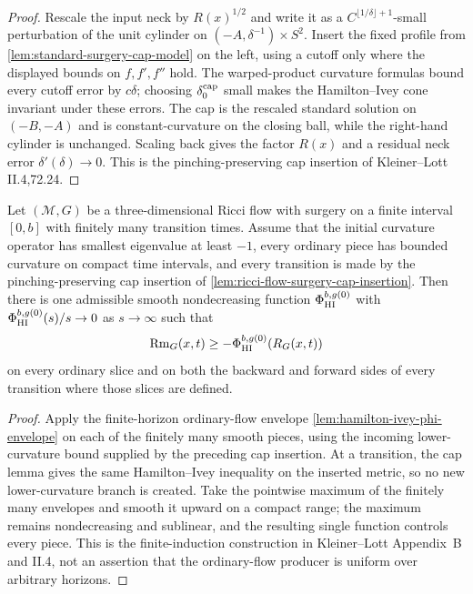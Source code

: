 \begin{proof}
Rescale the input neck by $R(x)^{1/2}$ and write it as a
$C^{\lfloor1/\delta\rfloor+1}$-small perturbation of the unit cylinder on
$(-A,\delta^{-1})\times S^2$.  Insert the fixed profile from
\ref{lem:standard-surgery-cap-model} on the left, using a cutoff only where
the displayed bounds on $f,f',f''$ hold.  The warped-product curvature
formulas bound every cutoff error by $c\delta$; choosing
$\delta_0^{\rm cap}$ small makes the Hamilton--Ivey cone invariant under
these errors.  The cap is the rescaled standard solution on $(-B,-A)$ and is
constant-curvature on the closing ball, while the right-hand cylinder is
unchanged.  Scaling back gives the factor $R(x)$ and a residual neck error
$\delta'(\delta)\to0$.  This is the pinching-preserving cap insertion of
Kleiner--Lott II.4,72.24.
\end{proof}

\begin{lemma}
\label{lem:finite-horizon-surgery-phi-envelope}
\notready
Let $(\mathcal M,G)$ be a three-dimensional Ricci flow with surgery on a
finite interval $[0,b]$ with finitely many transition times.  Assume that
the initial curvature operator has smallest eigenvalue at least $-1$, every
ordinary piece has bounded curvature on compact time intervals, and every
transition is made by the pinching-preserving cap insertion of
\ref{lem:ricci-flow-surgery-cap-insertion}.  Then there is one admissible
smooth nondecreasing function $\Phi_{\rm HI}^{b,g(0)}$ with
$\Phi_{\rm HI}^{b,g(0)}(s)/s\to0$ as $s\to\infty$ such that
\[
 \operatorname{Rm}_{G}(x,t)\ge-\Phi_{\rm HI}^{b,g(0)}(R_G(x,t))
\]
on every ordinary slice and on both the backward and forward sides of every
transition where those slices are defined.
\end{lemma}

\begin{proof}
Apply the finite-horizon ordinary-flow envelope
\ref{lem:hamilton-ivey-phi-envelope} on each of the finitely many smooth
pieces, using the incoming lower-curvature bound supplied by the preceding
cap insertion.  At a transition, the cap lemma gives the same Hamilton--Ivey
inequality on the inserted metric, so no new lower-curvature branch is
created.  Take the pointwise maximum of the finitely many envelopes and
smooth it upward on a compact range; the maximum remains nondecreasing and
sublinear, and the resulting single function controls every piece.  This is
the finite-induction construction in Kleiner--Lott Appendix~B and II.4,
not an assertion that the ordinary-flow producer is uniform over arbitrary
horizons.
\end{proof}

